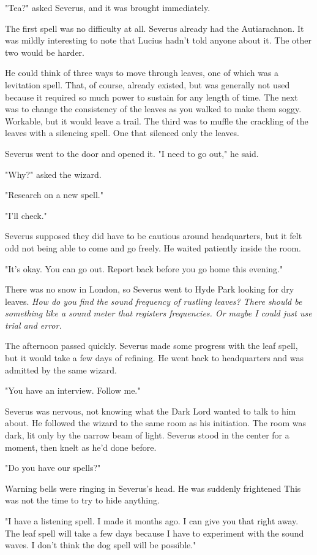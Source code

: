 \documentclass[a4paper,11pt]{article}
\begin{document}
"Tea?" asked Severus, and it was brought immediately.

The first spell was no difficulty at all. Severus already had the Autiarachnon. It was mildly interesting to note that Lucius hadn't told anyone about it. The other two would be harder.

He could think of three ways to move through leaves, one of which was a levitation spell. That, of course, already existed, but was generally not used because it required so much power to sustain for any length of time. The next was to change the consistency of the leaves as you walked to make them soggy. Workable, but it would leave a trail. The third was to muffle the crackling of the leaves with a silencing spell. One that silenced only the leaves.

Severus went to the door and opened it. "I need to go out," he said.

"Why?" asked the wizard.

"Research on a new spell."

"I'll check."

Severus supposed they did have to be cautious around headquarters, but it felt odd not being able to come and go freely. He waited patiently inside the room.

"It's okay. You can go out. Report back before you go home this evening."

There was no snow in London, so Severus went to Hyde Park looking for dry leaves. \emph{How do you find the sound frequency of rustling leaves? There should be something like a sound meter that registers frequencies. Or maybe I could just use trial and error.}

The afternoon passed quickly. Severus made some progress with the leaf spell, but it would take a few days of refining. He went back to headquarters and was admitted by the same wizard.

"You have an interview. Follow me."

Severus was nervous, not knowing what the Dark Lord wanted to talk to him about. He followed the wizard to the same room as his initiation. The room was dark, lit only by the narrow beam of light. Severus stood in the center for a moment, then knelt as he'd done before.

"Do you have our spells?"

Warning bells were ringing in Severus's head. He was suddenly frightened This was not the time to try to hide anything.

"I have a listening spell. I made it months ago. I can give you that right away. The leaf spell will take a few days because I have to experiment with the sound waves. I don't think the dog spell will be possible."
\end{document}
